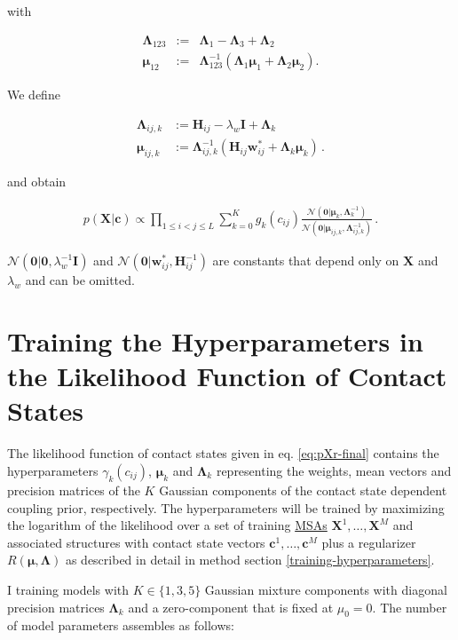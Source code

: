 \documentclass[11pt,a4paper,twoside]{book}
\newcommand{\Gauss}{\mathcal{N}}
\renewcommand{\H}{\mathbf{H}}
\newcommand{\I}{\mathbf{I}}
\newcommand{\Lijk}{\mathbf{\Lambda}_{ij,k}}
\newcommand{\Lk}{\mathbf{\Lambda}_k}
\newcommand{\muijk}{\mathbf{\mu}_{ij,k}}
\newcommand{\muk}{\mathbf{\mu}_k}
\renewcommand{\c}{\mathbf{c}}
\newcommand{\cij}{c_{ij}}
\newcommand{\wij}{\mathbf{w}_{ij}}
\newcommand{\X}{\mathbf{X}}
\theoremstyle{definition}
\theoremstyle{definition}
\theoremstyle{remark}
\begin{document}
with

\begin{eqnarray}
    \mathbf{\Lambda}_{123} &:=& \mathbf{\Lambda}_1 - \mathbf{\Lambda}_3 + \mathbf{\Lambda}_2 \\
    \mathbf{\mu}_{12}  &:=& \mathbf{\Lambda}_{123}^{-1}(\mathbf{\Lambda}_1 \mathbf{\mu}_1 + \mathbf{\Lambda}_2 \mathbf{\mu}_2).
\end{eqnarray}

We define

\begin{align}
    \Lijk   &:= \H_{ij} - \lambda_w \I + \Lk \\ 
    \muijk  &:= \Lijk^{-1}(\H_{ij} \wij^* + \Lk \muk) \,.
\label{eq:def-Jkij}
\end{align}

and obtain

\begin{align}
p(\X | \c) \propto \prod_{1 \le i < j \le L}  \sum_{k=0}^K g_{k}(\cij) \frac{\Gauss( \mathbf{0} | \muk, \Lk^{-1})}{\Gauss(\mathbf{0} | \muijk, \Lijk^{-1})}  \,.
\label{eq:pXr-final}
\end{align}

\(\Gauss( \mathbf{0} | \mathbf{0}, \lambda_w^{-1} \I)\) and
\(\Gauss( \mathbf{0} | \wij^*, \H_{ij}^{-1})\) are constants that depend
only on \(\X\) and \(\lambda_w\) and can be omitted.

\section{Training the Hyperparameters in the Likelihood Function of
Contact States}\label{bayesian-model-training-hyperparameters}

The likelihood function of contact states given in eq.
\eqref{eq:pXr-final} contains the hyperparameters \(\gamma_k(\cij)\),
\(\muk\) and \(\Lk\) representing the weights, mean vectors and
precision matrices of the \(K\) Gaussian components of the contact state
dependent coupling prior, respectively. The hyperparameters will be
trained by maximizing the logarithm of the likelihood over a set of
training \protect\hyperlink{abbrev}{MSAs} \(\X^1,\ldots,\X^M\) and
associated structures with contact state vectors \(\c^1,\ldots,\c^M\)
plus a regularizer \(R(\mathbf{\mu}, \mathbf{\Lambda})\) as described in
detail in method section \ref{training-hyperparameters}.

I training models with \(K \in \{1,3,5\}\) Gaussian mixture components
with diagonal precision matrices \(\Lk\) and a zero-component that is
fixed at \(\mu_0=0\). The number of model parameters assembles as
follows:
\end{document}

